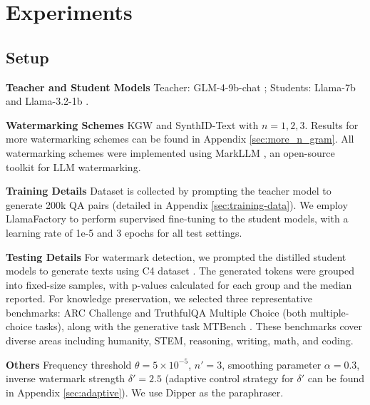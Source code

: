 \section{Experiments}

\subsection{Setup} 
\noindent\textbf{Teacher and Student Models} \quad Teacher: GLM-4-9b-chat \cite{glm2024chatglm}; Students: Llama-7b \cite{touvron2023llama} and Llama-3.2-1b \cite{dubey2024llama}. 

\vspace{3pt}

\noindent\textbf{Watermarking Schemes} \quad KGW \cite{DBLP:conf/icml/KirchenbauerGWK23} and SynthID-Text \cite{Dathathri2024} with $n=1,2,3$. Results for more watermarking schemes can be found in Appendix \ref{sec:more_n_gram}. All watermarking schemes were implemented using MarkLLM \cite{pan-etal-2024-markllm}, an open-source toolkit for LLM watermarking. 

\vspace{3pt}

\noindent\textbf{Training Details} \quad Dataset is collected by prompting the teacher model to generate 200k QA pairs (detailed in Appendix \ref{sec:training-data}). We employ LlamaFactory \cite{zheng2024llamafactory} to perform supervised fine-tuning to the student models, with a learning rate of 1e-5 and 3 epochs for all test settings.

\vspace{3pt}

\noindent\textbf{Testing Details} \quad For watermark detection, we prompted the distilled student models to generate texts using C4 dataset \cite{raffel2020exploring}. The generated tokens were grouped into fixed-size samples, with p-values calculated for each group and the median reported. For knowledge preservation, we selected three representative benchmarks: ARC Challenge \cite{Clark2018ThinkYH} and TruthfulQA Multiple Choice \cite{lin-etal-2022-truthfulqa} (both multiple-choice tasks), along with the generative task MTBench \cite{zheng2023judging}. These benchmarks cover diverse areas including humanity, STEM, reasoning, writing, math, and coding.

\noindent\textbf{Others} \quad Frequency threshold $\theta=5\times 10^{-5}$, $n'=3$, smoothing parameter $\alpha=0.3$, inverse watermark strength $\delta'=2.5$ (adaptive control strategy for $\delta'$ can be found in Appendix \ref{sec:adaptive}). We use Dipper \cite{krishna2023paraphrasing} as the paraphraser.

